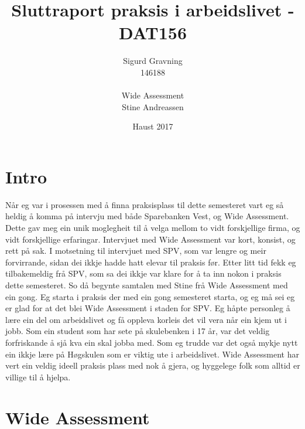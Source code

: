 \documentclass[12pt]{article}
\title{Sluttraport praksis i arbeidslivet - DAT156}
\date{Haust 2017}
\author{Sigurd Gravning \\146188 \\ \\Wide Assessment \\Stine Andreassen}
\begin{document}
\maketitle
{}
\newpage
{}
\tableofcontents
\newpage

\section{Intro}

Når eg var i prosessen med å finna praksisplass til dette semesteret vart eg så
heldig å komma på intervju med både Sparebanken Vest, og Wide Assessment.
Dette gav meg ein unik moglegheit til å velga mellom to vidt forskjellige firma,
og vidt forskjellige erfaringar. Intervjuet med Wide Assessment var kort, konsist,
og rett på sak. I motsetning til intervjuet med SPV, som var lengre og meir forvirrande,
sidan dei ikkje hadde hatt elevar til praksis før. Etter litt tid fekk eg
tilbakemeldig frå SPV, som sa dei ikkje var klare for å ta inn nokon i praksis
dette semesteret. So då begynte samtalen med Stine frå Wide Assessment med ein gong.
Eg starta  i praksis der med ein gong semesteret starta, og eg må sei eg er glad
for at det blei Wide Assessment i staden for SPV. Eg håpte personleg å lære ein
del om arbeidslivet og få oppleva korleis det vil vera når ein kjem ut i jobb.
Som ein student som har sete på skulebenken i 17 år, var det veldig forfriskande
å sjå kva ein skal jobba med. Som eg trudde var det også mykje nytt ein ikkje
lære på Høgskulen som er viktig ute i arbeidslivet. Wide Assessment har vert
ein veldig ideell praksis plass med nok å gjera, og hyggelege folk som alltid
er villige til å hjelpa. 

\section{Wide Assessment}
\end{document}
